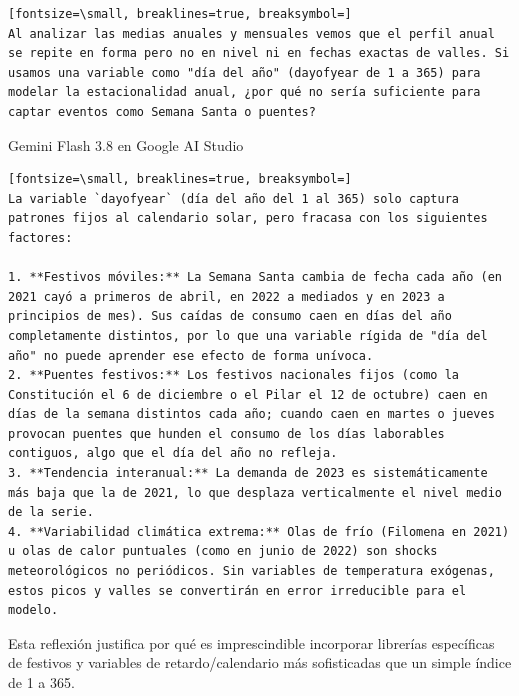 \documentclass[12pt,a4paper,oneside]{book}
\begin{document}
\begin{iaprompt}
\begin{Verbatim}[fontsize=\small, breaklines=true, breaksymbol=]
Al analizar las medias anuales y mensuales vemos que el perfil anual se repite en forma pero no en nivel ni en fechas exactas de valles. Si usamos una variable como "día del año" (dayofyear de 1 a 365) para modelar la estacionalidad anual, ¿por qué no sería suficiente para captar eventos como Semana Santa o puentes?
\end{Verbatim}
\end{iaprompt}
\begin{iaresp}{Gemini Flash 3.8 en Google AI Studio}
\begin{Verbatim}[fontsize=\small, breaklines=true, breaksymbol=]
La variable `dayofyear` (día del año del 1 al 365) solo captura patrones fijos al calendario solar, pero fracasa con los siguientes factores:

1. **Festivos móviles:** La Semana Santa cambia de fecha cada año (en 2021 cayó a primeros de abril, en 2022 a mediados y en 2023 a principios de mes). Sus caídas de consumo caen en días del año completamente distintos, por lo que una variable rígida de "día del año" no puede aprender ese efecto de forma unívoca.
2. **Puentes festivos:** Los festivos nacionales fijos (como la Constitución el 6 de diciembre o el Pilar el 12 de octubre) caen en días de la semana distintos cada año; cuando caen en martes o jueves provocan puentes que hunden el consumo de los días laborables contiguos, algo que el día del año no refleja.
3. **Tendencia interanual:** La demanda de 2023 es sistemáticamente más baja que la de 2021, lo que desplaza verticalmente el nivel medio de la serie.
4. **Variabilidad climática extrema:** Olas de frío (Filomena en 2021) u olas de calor puntuales (como en junio de 2022) son shocks meteorológicos no periódicos. Sin variables de temperatura exógenas, estos picos y valles se convertirán en error irreducible para el modelo.
\end{Verbatim}
\end{iaresp}
\begin{iaanalisis}
Esta reflexión justifica por qué es imprescindible incorporar librerías específicas de festivos y variables de retardo/calendario más sofisticadas que un simple índice de 1 a 365.
\end{iaanalisis}
\end{document}
